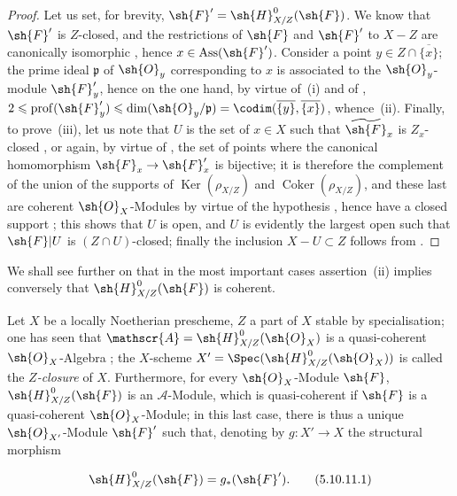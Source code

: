 \begin{proof}
Let us set, for brevity, $\sh{F}'=\sh{H}^0_{X/Z}(\sh{F})$.
We know  that $\sh{F}'$ is $Z$-closed, and the restrictions of $\sh{F}$ and $\sh{F}'$ to $X-Z$ are canonically isomorphic , hence $x\in\operatorname{Ass}(\sh{F}')$.
Consider a point $y\in Z\cap\overline{\{x\}}$; the prime ideal $\mathfrak{p}$ of $\sh{O}_y$ corresponding to $x$ is associated to the $\sh{O}_y$-module $\sh{F}'_y$, hence on the one hand, by virtue of~(i) and of , $2\leqslant\operatorname{prof}(\sh{F}'_y)\leqslant\dim(\sh{O}_y/\mathfrak{p})=\codim(\overline{\{y\}},\overline{\{x\}})$, whence~(ii).
Finally, to prove~(iii), let us note that $U$ is the set of $x\in X$ such that $\widetilde{\sh{F}}_x$ is $Z_x$-closed , or again, by virtue of , the set of points where the canonical homomorphism $\sh{F}_x\to\sh{F}'_x$ is bijective; it is therefore the complement of the union of the supports of $\operatorname{Ker}(\rho_{X/Z})$ and $\operatorname{Coker}(\rho_{X/Z})$, and these last are coherent $\sh{O}_X$-Modules by virtue of the hypothesis , hence have a closed support ; this shows that $U$ is open, and $U$ is evidently the largest open such that $\sh{F}|U$ is $(Z\cap U)$-closed; finally the inclusion $X-U\subset Z$ follows from .
\end{proof}

We shall see further on  that in the most important cases assertion~(ii) implies conversely that $\sh{H}^0_{X/Z}(\sh{F})$ is coherent.

\begin{env}[5.10.11]
\label{IV.5.10.11}
Let $X$ be a locally Noetherian prescheme, $Z$ a part of $X$ stable by specialisation; one has seen that $\mathscr{A}=\sh{H}^0_{X/Z}(\sh{O}_X)$ is a quasi-coherent $\sh{O}_X$-Algebra ; the $X$-scheme $X'=\Spec(\sh{H}^0_{X/Z}(\sh{O}_X))$  is called the \emph{$Z$-closure} of $X$.
Furthermore, for every $\sh{O}_X$-Module $\sh{F}$, $\sh{H}^0_{X/Z}(\sh{F})$ is an $\mathscr{A}$-Module, which is quasi-coherent if $\sh{F}$ is a quasi-coherent $\sh{O}_X$-Module; in this last case, there is thus a unique $\sh{O}_{X'}$-Module $\sh{F}'$ such that, denoting by $g:X'\to X$ the structural morphism
\end{env}

\begin{equation}
\label{IV.5.10.11.1}
\sh{H}^0_{X/Z}(\sh{F})=g_*(\sh{F}'). \tag{5.10.11.1}
\end{equation}

